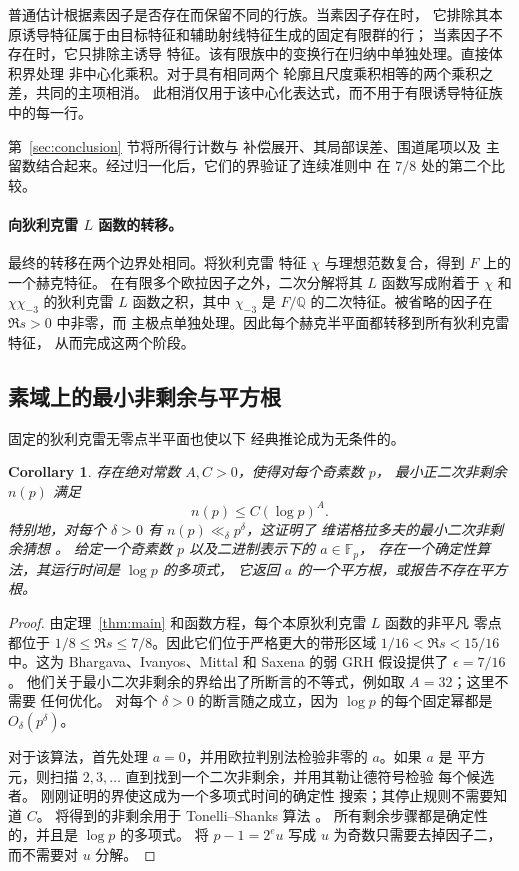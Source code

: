 \documentclass[11pt,a4paper]{article}
\numberwithin{equation}{section}
\numberwithin{figure}{section}
\newtheorem{corollary}[theorem]{Corollary}
\theoremstyle{definition}
\theoremstyle{remark}
\begin{document}
普通估计根据素因子是否存在而保留不同的行族。当素因子存在时，
它排除其本原诱导特征属于由目标特征和辅助射线特征生成的固定有限群的行；
当素因子不存在时，它只排除主诱导
特征。该有限族中的变换行在归纳中单独处理。直接体积界处理
非中心化乘积。对于具有相同两个
轮廓且尺度乘积相等的两个乘积之差，共同的主项相消。
此相消仅用于该中心化表达式，而不用于有限诱导特征族中的每一行。

第~\ref{sec:conclusion} 节将所得行计数与
补偿展开、其局部误差、围道尾项以及
主留数结合起来。经过归一化后，它们的界验证了连续准则中
在 $7/8$ 处的第二个比较。

\paragraph{向狄利克雷 $L$ 函数的转移。}
最终的转移在两个边界处相同。将狄利克雷
特征 $\chi$ 与理想范数复合，得到 $F$ 上的一个赫克特征。
在有限多个欧拉因子之外，二次分解将其
$L$ 函数写成附着于 $\chi$
和 $\chi\chi_{-3}$ 的狄利克雷 $L$ 函数之积，其中 $\chi_{-3}$ 是
$F/\mathbb Q$ 的二次特征。被省略的因子在 $\Re s>0$ 中非零，而
主极点单独处理。因此每个赫克半平面都转移到所有狄利克雷特征，
从而完成这两个阶段。

\subsection*{素域上的最小非剩余与平方根}

固定的狄利克雷无零点半平面也使以下
经典推论成为无条件的。\begin{corollary}\label{cor:nonresidues-square-roots}
存在绝对常数 $A,C>0$，使得对每个奇素数 $p$，
最小正二次非剩余 $n(p)$ 满足
\[
 n(p)\le C(\log p)^A.
\]
特别地，对每个 $\delta>0$ 有 $n(p)\ll_\delta p^\delta$，这证明了
维诺格拉多夫的最小二次非剩余猜想
\cite[Conjecture 1.1]{TaoNonresidues}。
给定一个奇素数 $p$ 以及二进制表示下的 $a\in\mathbb F_p$，
存在一个确定性算法，其运行时间是 $\log p$ 的多项式，
它返回 $a$ 的一个平方根，或报告不存在平方根。
\end{corollary}

\begin{proof}
由定理~\ref{thm:main} 和函数方程，每个本原狄利克雷 $L$ 函数的非平凡
零点都位于
$1/8\le\Re s\le7/8$。因此它们位于严格更大的带形区域
$1/16<\Re s<15/16$ 中。这为
Bhargava、Ivanyos、Mittal 和 Saxena
\cite[Conjecture 6.3 and Theorem 6.7]{BIMS} 的弱 GRH 假设提供了
$\epsilon=7/16$。
他们关于最小二次非剩余的界给出了所断言的不等式，例如取 $A=32$；这里不需要
任何优化。
对每个 $\delta>0$ 的断言随之成立，因为 $\log p$ 的每个固定幂都是
$O_\delta(p^\delta)$。

对于该算法，首先处理 $a=0$，并用欧拉判别法检验非零的 $a$。如果 $a$ 是
平方元，则扫描 $2,3,\ldots$ 直到找到一个二次非剩余，并用其勒让德符号检验
每个候选者。
刚刚证明的界使这成为一个多项式时间的确定性
搜索；其停止规则不需要知道 $C$。
将得到的非剩余用于 Tonelli--Shanks 算法
\cite[Section 2.9, Algorithm 3 and Lemma 2.9.5]{Galbraith}。
所有剩余步骤都是确定性的，并且是 $\log p$ 的多项式。
将 $p-1=2^e u$ 写成 $u$ 为奇数只需要去掉因子二，
而不需要对 $u$ 分解。
\end{proof}
\end{document}
